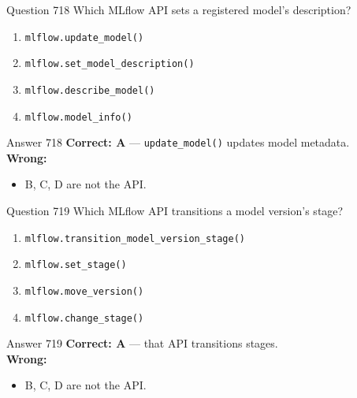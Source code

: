 \documentclass[aspectratio=169,11pt]{beamer}
\begin{document}
	\begin{frame}{Question 718}
		Which MLflow API sets a registered model's description?
		\begin{enumerate}[label=\Alph*.]
			\item \texttt{mlflow.update\_model()}
			\item \texttt{mlflow.set\_model\_description()}
			\item \texttt{mlflow.describe\_model()}
			\item \texttt{mlflow.model\_info()}
		\end{enumerate}
	\end{frame}
	\begin{frame}{Answer 718}
		\textbf{Correct: A} --- \texttt{update\_model()} updates model metadata.\\
		\vspace{0.5em}
		\textbf{Wrong:}
		\begin{itemize}
			\item B, C, D are not the API.
		\end{itemize}
	\end{frame}
	
	\begin{frame}{Question 719}
		Which MLflow API transitions a model version's stage?
		\begin{enumerate}[label=\Alph*.]
			\item \texttt{mlflow.transition\_model\_version\_stage()}
			\item \texttt{mlflow.set\_stage()}
			\item \texttt{mlflow.move\_version()}
			\item \texttt{mlflow.change\_stage()}
		\end{enumerate}
	\end{frame}
	\begin{frame}{Answer 719}
		\textbf{Correct: A} --- that API transitions stages.\\
		\vspace{0.5em}
		\textbf{Wrong:}
		\begin{itemize}
			\item B, C, D are not the API.
		\end{itemize}
	\end{frame}
	
\end{document}
